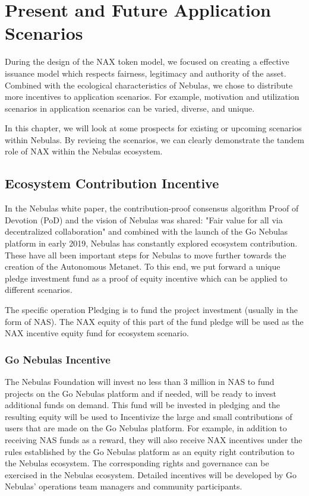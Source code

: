 \section{Present and Future Application Scenarios}
During the design of the NAX token model, we focused on creating a effective issuance model which respects fairness, legitimacy and authority of the asset. Combined with the ecological characteristics of Nebulas, we chose to distribute more incentives to application scenarios. For example, motivation and utilization scenarios in application scenarios can be varied, diverse, and unique.

In this chapter, we will look at some prospects for existing or upcoming scenarios within Nebulas. By revieing the scenarios, we can clearly demonstrate the tandem role of NAX within the Nebulas ecosystem.

\subsection{Ecosystem Contribution Incentive}
In the Nebulas white paper, the contribution-proof consensus algorithm Proof of Devotion (PoD) and the vision of Nebulas was shared: "Fair value for all via decentralized collaboration" and combined with the launch of the Go Nebulas platform in early 2019, Nebulas has constantly explored ecosystem contribution. These have all been important steps for Nebulas to move further towards the creation of the Autonomous Metanet. To this end, we put forward a unique pledge investment fund as a proof of equity incentive which can be applied to different scenarios.

The specific operation Pledging is to fund the project investment (usually in the form of NAS). The NAX equity of this part of the fund pledge will be used as the NAX incentive equity fund for ecosystem scenario.

\subsubsection{Go Nebulas Incentive}
The Nebulas Foundation will invest no less than $3$ million in NAS to fund projects on the Go Nebulas platform and if needed, will be ready to invest additional funds on demand. This fund will be invested in pledging and the resulting equity will be used to Incentivize the large and small contributions of users that are made on the Go Nebulas platform. For example, in addition to receiving NAS funds as a reward, they will also receive NAX incentives under the rules established by the Go Nebulas platform as an equity right contribution to the Nebulas ecosystem. The corresponding rights and governance can be exercised in the Nebulas ecosystem. Detailed incentives will be developed by Go Nebulas' operations team managers and community participants.

